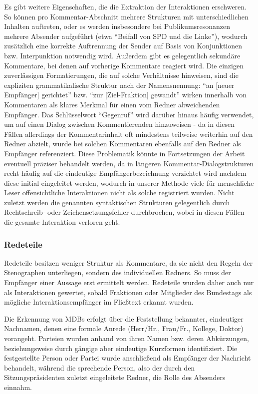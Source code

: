 Es gibt weitere Eigenschaften, die die Extraktion der Interaktionen
erschweren. So können pro Kommentar-Abschnitt mehrere Strukturen mit
unterschiedlichen Inhalten auftreten, oder es werden insbesondere bei
Publikumsresonanzen mehrere Absender aufgeführt (etwa
\enquote{Beifall von SPD und die Linke}), wodurch zusätzlich eine korrekte
Auftrennung der Sender auf Basis von Konjunktionen bzw. Interpunktion
notwendig wird. Außerdem gibt es gelegentlich sekundäre Kommentare, bei denen
auf vorherige Kommentare reagiert wird. Die einzigen zuverlässigen
Formatierungen, die auf solche Verhältnisse hinweisen, sind die expliziten
grammatikalische Struktur nach der Namensnennung:
\enquote{an [neuer Empfänger] gerichtet} bzw. \enquote{zur [Ziel-Fraktion] gewandt}
wirken innerhalb von Kommentaren als klares Merkmal für einen vom Redner
abweichenden Empfänger. Das Schlüsselwort \enquote{Gegenruf} wird darüber
hinaus häufig verwendet, um auf einen Dialog zwischen Kommentierenden
hinzuweisen - da in diesen Fällen allerdings der Kommentarinhalt oft
mindestens teilweise weiterhin auf den Redner abzielt, wurde bei solchen
Kommentaren ebenfalls auf den Redner als Empfänger referenziert. Diese
Problematik könnte in Fortsetzungen der Arbeit eventuell präziser behandelt
werden, da in längeren Kommentar-Dialogstrukturen recht häufig auf die
eindeutige Empfängerbezeichnung verzichtet wird nachdem diese initial
eingeleitet werden, wodurch in unserer Methode viele für menschliche Leser
offensichtliche Interaktionen nicht als solche registriert wurden. Nicht
zuletzt werden die genannten syntaktischen Strukturen gelegentlich durch
Rechtschreib- oder Zeichensetzungsfehler durchbrochen, wobei in diesen Fällen
die gesamte Interaktion verloren geht.

\subsubsection{Redeteile}
Redeteile besitzen weniger Struktur als Kommentare, da sie nicht den Regeln der
Stenographen unterliegen, sondern des individuellen Redners. So muss der
Empfänger einer Aussage erst ermittelt werden. Redeteile wurden daher auch nur
als Interaktionen gewertet, sobald Fraktionen oder Mitglieder des Bundestags
als mögliche Interaktionsempfänger im Fließtext erkannt wurden.

Die Erkennung von MDBs erfolgt über die Feststellung bekannter, eindeutiger
Nachnamen, denen eine formale Anrede (Herr/Hr., Frau/Fr., Kollege, Doktor)
vorangeht. Parteien wurden anhand von ihren Namen bzw. deren Abkürzungen,
beziehungsweise durch gängige aber eindeutige Kurzformen identifiziert. Die
festgestellte Person oder Partei wurde anschließend als Empfänger der Nachricht
behandelt, während die sprechende Person, also der durch den
Sitzungspräsidenten zuletzt eingeleitete Redner, die Rolle des Absenders
einnahm.

